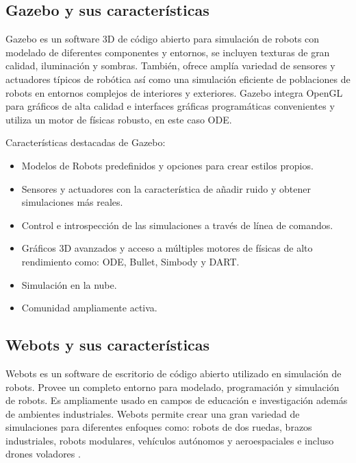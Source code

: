 \subsection{Gazebo y sus características} \label{sub:gazebo_y_sus_ características}

Gazebo es un software 3D de código abierto para simulación de robots con modelado de diferentes componentes y entornos, se incluyen texturas de gran calidad, iluminación y sombras. También, ofrece amplía variedad de sensores y actuadores típicos de robótica así como una simulación eficiente de poblaciones de robots en entornos complejos de interiores y exteriores. Gazebo integra OpenGL para gráficos de alta calidad e interfaces gráficas programáticas convenientes y utiliza un motor de físicas robusto, en este caso ODE.

Características destacadas de Gazebo:
\begin{itemize}
    \item Modelos de Robots predefinidos y opciones para crear estilos propios.
    \item Sensores y actuadores con la característica de añadir ruido y obtener simulaciones más reales.
    \item Control e introspección de las simulaciones a través de línea de comandos.
    \item Gráficos 3D avanzados y acceso a múltiples motores de físicas de alto rendimiento como: ODE, Bullet, Simbody y DART.
    \item Simulación en la nube.
    \item Comunidad ampliamente activa.
\end{itemize}

\subsection{Webots y sus características} \label{sub:webots_y_sus_características}

Webots es un software de escritorio de código abierto utilizado en simulación de robots. Provee un completo entorno para modelado, programación y simulación de robots. Es ampliamente usado en campos de educación e investigación además de ambientes industriales. Webots permite crear una gran variedad de simulaciones para diferentes enfoques como: robots de dos ruedas, brazos industriales, robots modulares, vehículos autónomos y aeroespaciales e incluso drones voladores \cite{Webots}.

